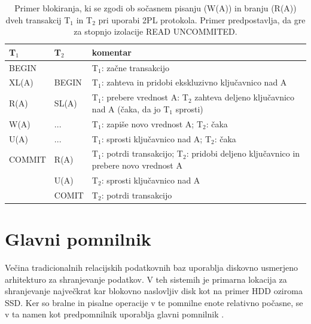 \documentclass[a4paper, 12pt]{book}
\begin{document}
\begin{table}[H]
\begin{center}
\begin{tabular}{p{}|p{}|p{}} 
    \textbf{T$_{\text{1}}$} & \textbf{T$_{\text{2}}$} & \textbf{komentar} \\
\hline
BEGIN  &        & T$_{\text{1}}$: začne transakcijo \\
XL(A)  & BEGIN  & T$_{\text{1}}$: zahteva in pridobi ekskluzivno ključavnico nad A \\
R(A)   & SL(A)  & T$_{\text{1}}$: prebere vrednost A: T$_{\text{2}}$ zahteva deljeno ključavnico nad A (čaka, da jo T$_{\text{1}}$ sprosti) \\
W(A)   & ...    & T$_{\text{1}}$: zapiše novo vrednost A; T$_{\text{2}}$: čaka  \\
U(A)   & ...    & T$_{\text{1}}$: sprosti ključavnico nad A; T$_{\text{2}}$: čaka \\
COMMIT & R(A)    & T$_{\text{1}}$: potrdi transakcijo; T$_{\text{2}}$: pridobi deljeno ključavnico in prebere novo vrednost A \\
        & U(A)   & T$_{\text{2}}$: sprosti ključavnico nad A \\
        & COMIT  & T$_{\text{2}}$: potrdi transakcijo \\
\end{tabular}
\end{center}
\caption{Primer \cite{lecture-2pl} blokiranja, ki se zgodi ob sočasnem pisanju (W(A)) in branju (R(A)) dveh transakcij T$_{\text{1}}$ in T$_{\text{2}}$ pri uporabi 2PL protokola. Primer predpostavlja, da gre za stopnjo izolacije READ UNCOMMITED. }
\label{tbl_cc_2pl_example}
\end{table}

\section{Glavni pomnilnik}

Večina tradicionalnih relacijskih podatkovnih baz uporablja diskovno usmerjeno arhitekturo za shranjevanje podatkov. V teh sistemih je primarna lokacija za shranjevanje največkrat kar blokovno naslovljiv disk kot na primer HDD oziroma SSD. Ker so bralne in pisalne operacije v te pomnilne enote relativno počasne, se v ta namen kot predpomnilnik uporablja glavni pomnilnik \cite{Pavlo2016Sep}.
\end{document}
